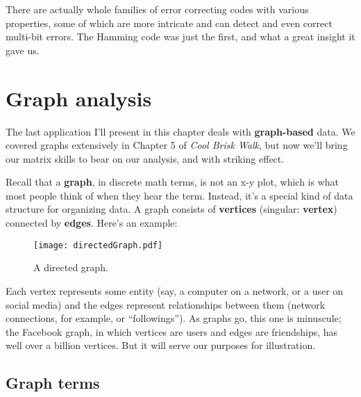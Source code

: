 There are actually whole families of error correcting codes with various
properties, some of which are more intricate and can detect and even correct
multi-bit errors. The Hamming code was just the first, and what a great insight
it gave us.



\pagebreak

\renewcommand{\thesubsection}{G\arabic{subsection}.}%
\section{Graph analysis}

\label{sec:graphs}

The last application I'll present in this chapter deals with
\textbf{graph-based} data. We covered graphs extensively in Chapter 5 of
\textit{Cool Brisk Walk}, but now we'll bring our matrix skills to bear on our
analysis, and with striking effect.


Recall that a \textbf{graph}, in discrete math terms, is not an x-y plot,
which is what most people think of when they hear the term. Instead, it's a
special kind of data structure for organizing data. A graph consists of
\textbf{vertices} (singular: \textbf{vertex}) connected by \textbf{edges}.
Here's an example:

\begin{figure}[ht]
\centering
\texttt{[image: directedGraph.pdf]}
\caption{A directed graph.}
\label{fig:directedGraph}
\end{figure}

Each vertex represents some entity (say, a computer on a network, or a user on
social media) and the edges represent relationships between them (network
connections, for example, or ``followings''). As graphs go, this one is
minuscule; the Facebook graph, in which vertices are users and edges are
friendships, has well over a billion vertices. But it will serve our purposes
for illustration.


\subsection{Graph terms}

